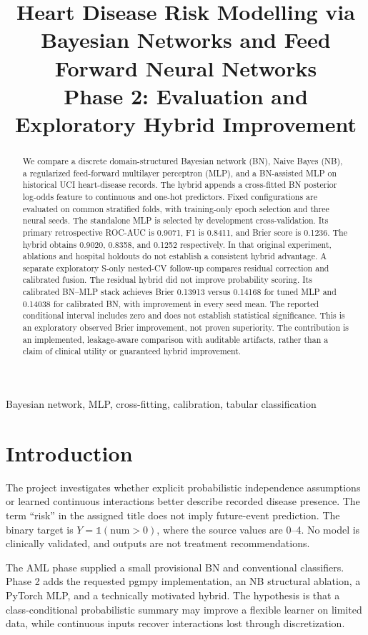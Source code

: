 \documentclass[conference]{IEEEtran}
\title{Heart Disease Risk Modelling via Bayesian Networks and Feed Forward Neural Networks\\Phase 2: Evaluation and Exploratory Hybrid Improvement}
\author{\IEEEauthorblockN{Nishtha Gupta, Aditya Srivastava, Aanya Mehrotra}
\IEEEauthorblockN{Shrijan Sanidhya, Abhay Mallik}
\IEEEauthorblockA{Team T008, Section C\\Newton School of Technology, Rishihood University}}
\begin{document}
\maketitle
\begin{abstract}
We compare a discrete domain-structured Bayesian network (BN), Naive Bayes (NB), a regularized feed-forward multilayer perceptron (MLP), and a BN-assisted MLP on historical UCI heart-disease records. The hybrid appends a cross-fitted BN posterior log-odds feature to continuous and one-hot predictors. Fixed configurations are evaluated on common stratified folds, with training-only epoch selection and three neural seeds. The standalone MLP is selected by development cross-validation. Its primary retrospective ROC-AUC is 0.9071, F1 is 0.8411, and Brier score is 0.1236. The hybrid obtains 0.9020, 0.8358, and 0.1252 respectively. In that original experiment, ablations and hospital holdouts do not establish a consistent hybrid advantage. A separate exploratory S-only nested-CV follow-up compares residual correction and calibrated fusion. The residual hybrid did not improve probability scoring. Its calibrated BN--MLP stack achieves Brier 0.13913 versus 0.14168 for tuned MLP and 0.14038 for calibrated BN, with improvement in every seed mean. The reported conditional interval includes zero and does not establish statistical significance. This is an exploratory observed Brier improvement, not proven superiority. The contribution is an implemented, leakage-aware comparison with auditable artifacts, rather than a claim of clinical utility or guaranteed hybrid improvement.
\end{abstract}
\begin{IEEEkeywords}Bayesian network, MLP, cross-fitting, calibration, tabular classification\end{IEEEkeywords}
\section{Introduction}
The project investigates whether explicit probabilistic independence assumptions or learned continuous interactions better describe recorded disease presence. The term ``risk'' in the assigned title does not imply future-event prediction. The binary target is $Y=\mathbb{1}(\mathrm{num}>0)$, where the source values are 0--4. No model is clinically validated, and outputs are not treatment recommendations.

The AML phase supplied a small provisional BN and conventional classifiers. Phase 2 adds the requested pgmpy implementation, an NB structural ablation, a PyTorch MLP, and a technically motivated hybrid. The hypothesis is that a class-conditional probabilistic summary may improve a flexible learner on limited data, while continuous inputs recover interactions lost through discretization.
\end{document}
